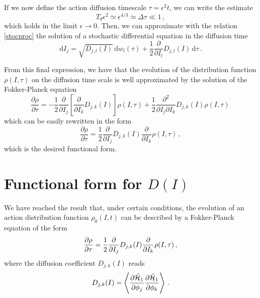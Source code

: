 If we now define the action diffusion timescale $\tau=\epsilon^2 t$, we can write the estimate 
\begin{equation}
    T_\theta \epsilon^2\simeq \epsilon^{4/3}\simeq \Delta \tau\ll 1 \,,
\end{equation}
which holds in the limit $\epsilon\to 0$. Then, we can approximate with the relation \eqref{stocproc} the solution of a stochastic differential equation in the diffusion time
\begin{equation}
    \mathrm{d}I_j=\sqrt{D_{j,l}(I)}\,\mathrm{d}w_l(\tau)+
    \frac{1}{2} \frac{\partial}{\partial I_l}D_{j,l}(I) \,\mathrm{d}\tau \,.
    \label{stocaction}
\end{equation}

From this final expression, we have that the evolution of the distribution function $\rho(I,\tau)$ on the diffusion time scale is well approximated by the solution of the Fokker-Planck equation
\begin{equation}
    \frac{\partial \rho}{\partial \tau}=- \frac{1}{2} \frac{\partial }{\partial I_j}
    \left [\frac{\partial}{\partial I_k}D_{j,k}(I) \right ]\rho(I,\tau)
    +\frac{1}{2}\frac{\partial^2}{\partial I_j\partial I_k}D_{j,k}(I)\rho(I,\tau)\,
\end{equation}
which can be easily rewritten in the form
\begin{equation}
    \frac{\partial \rho}{\partial \tau}=
    \frac{1}{2}\frac{\partial}{\partial I_j}D_{j,k}(I)
    \frac{\partial}{\partial I_k}\rho(I,\tau) \,,
    \label{fokker1}
\end{equation}
which is the desired functional form.

\section{Functional form for $D(I)$}\label{sec:diff:functional_form}

We have reached the result that, under certain conditions, the evolution of an action distribution function $\rho_0(I, t)$ can be described by a Fokker-Planck equation of the form
\begin{equation}
    \pdv{\rho}{\tau}=\frac{1}{2}\pdv{}{I_j} D_{j,k}(I) \pdv{}{I_k}\rho(I,\tau)\,,
    \label{eq:final-fp}
\end{equation} 
where the diffusion coefficient $D_{j,k}(I)$ reads
\begin{equation}
    D_{j,k}(I) = \left\langle\pdv{\hat{\mathcal{H}}_1}{\phi_j}\pdv{\hat{\mathcal{H}}_1}{\phi_k}\right\rangle \,.
\end{equation}

